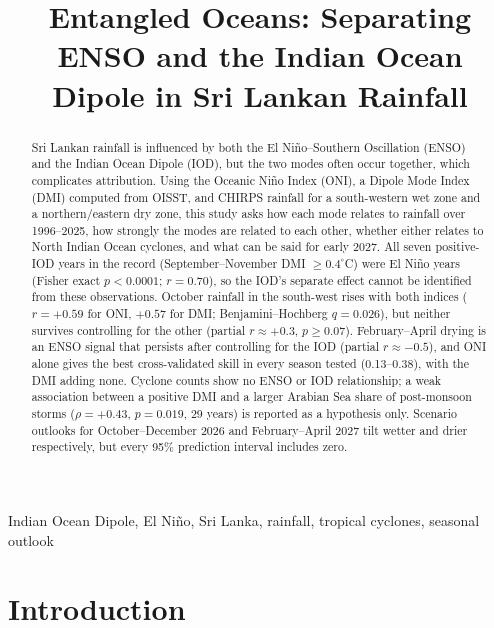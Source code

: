 \documentclass{article}
\title{Entangled Oceans: Separating ENSO and the Indian Ocean Dipole in Sri Lankan Rainfall}
\begin{document}
\ninept
\maketitle

\begin{abstract}
Sri Lankan rainfall is influenced by both the El Ni\~{n}o--Southern Oscillation (ENSO) and the
Indian Ocean Dipole (IOD), but the two modes often occur together, which complicates attribution.
Using the Oceanic Ni\~{n}o Index (ONI), a Dipole Mode Index (DMI) computed from OISST, and CHIRPS
rainfall for a south-western wet zone and a northern/eastern dry zone, this study asks how each mode
relates to rainfall over 1996--2025, how strongly the modes are related to each other, whether
either relates to North Indian Ocean cyclones, and what can be said for early 2027. All seven
positive-IOD years in the record (September--November DMI $\geq0.4^{\circ}$C) were El Ni\~{n}o years
(Fisher exact $p<0.0001$; $r=0.70$), so the IOD's separate effect cannot be identified from these
observations. October rainfall in the south-west rises with both indices ($r=+0.59$ for ONI, $+0.57$
for DMI; Benjamini--Hochberg $q=0.026$), but neither survives controlling for the other (partial
$r\approx+0.3$, $p\geq0.07$). February--April drying is an ENSO signal that persists after
controlling for the IOD (partial $r\approx-0.5$), and ONI alone gives the best cross-validated skill
in every season tested (0.13--0.38), with the DMI adding none. Cyclone counts show no ENSO or IOD
relationship; a weak association between a positive DMI and a larger Arabian Sea share of
post-monsoon storms ($\rho=+0.43$, $p=0.019$, 29 years) is reported as a hypothesis only. Scenario
outlooks for October--December 2026 and February--April 2027 tilt wetter and drier respectively,
but every 95\% prediction interval includes zero.
\end{abstract}

\begin{keywords}
Indian Ocean Dipole, El Ni\~{n}o, Sri Lanka, rainfall, tropical cyclones, seasonal outlook
\end{keywords}

\section{Introduction}
\end{document}
